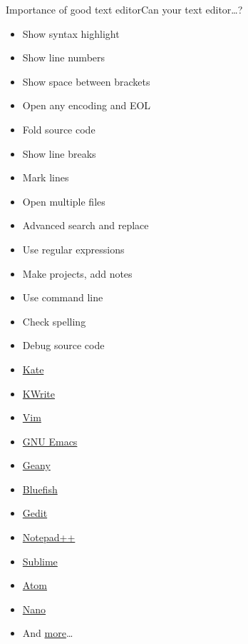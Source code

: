 \documentclass[compress, ucs, xelatex, 11pt, xcolor=svgnames,
  hyperref={
    bookmarks=true,
    unicode=true,
    colorlinks=true,
    pdftitle={Linux, command line and MetaCentrum},
    plainpages=false,
    pdfauthor={Vojtech Zeisek},
    pdfsubject={Course about use of Linux command line, writing shell scripts and using MetaCentrum of CESNET},
    pdfcreator={XeLaTeX},
    pdfkeywords={Linux, GNU, BASH, shell, command line, MetaCentrum},
    linkcolor=DarkRed,
    anchorcolor=DarkBlue,
    citecolor=Indigo,
    filecolor=NavyBlue,
    menucolor=DarkMagenta,
    urlcolor=DarkBlue,
    pdftex},
  url={hyphens, lowtilde} %
  ]{beamer}
\begin{document}
\begin{frame}{Importance of good text editor}{Can your text editor\ldots ?}
  \label{editors}
  \begin{multicols}{2}
    \begin{itemize}
      \item Show syntax highlight
      \item Show line numbers
      \item Show space between brackets
      \item Open any encoding and EOL
      \item Fold source code
      \item Show line breaks
      \item Mark lines
      \item Open multiple files
      \item Advanced search and replace
      \item Use regular expressions
      \item Make projects, add notes
      \item Use command line
      \item Check spelling
      \item Debug source code
    \end{itemize}
  \end{multicols}
  \begin{multicols}{4}
    \begin{itemize}
      \item \href{http://kate-editor.org/}{Kate}
      \item \href{https://www.kde.org/applications/utilities/kwrite/}{KWrite}
      \item \href{http://www.vim.org/}{Vim}
      \item \href{https://en.wikipedia.org/wiki/Emacs}{GNU Emacs}
      \item \href{https://www.geany.org/}{Geany}
      \item \href{http://bluefish.openoffice.nl/index.html}{Bluefish}
      \item \href{https://wiki.gnome.org/Apps/Gedit}{Gedit}
      \item \href{https://notepad-plus-plus.org/}{Notepad++}
      \item \href{https://www.sublimetext.com/}{Sublime}
      \item \href{https://atom.io/}{Atom}
      \item \href{https://www.nano-editor.org/}{Nano}
      \item And \href{https://en.wikipedia.org/wiki/List_of_text_editors}{more}\ldots
    \end{itemize}
  \end{multicols}
\end{frame}
\end{document}

